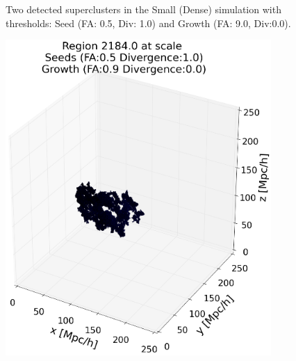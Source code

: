 \documentclass[12pt]{article}
\begin{document}
\begin{figure}[ht]
\begin{minipage}{.5\textwidth}
\end{minipage}
\caption{Two detected superclusters in the Small (Dense) simulation with thresholds: Seed (FA: 0.5, Div: 1.0) and Growth (FA: 9.0, Div:0.0). }
\label{fg:detected_small_51_90}
\end{figure}
\FloatBarrier

\begin{figure}[ht]
\centering
\begin{minipage}{.5\textwidth}
  \centering
  \includegraphics[width=0.9\textwidth]{groups/3d/seeds_FA_5/region_2184_scale_seeds_FA_05_Trace_10_search_FA_09_Trace_00_.png} %
\end{minipage}%
\begin{minipage}{.5\textwidth}
  \centering

\end{minipage}
\end{figure}
\end{document}
